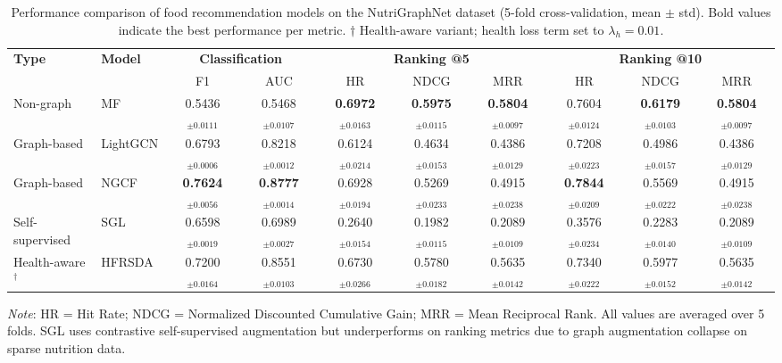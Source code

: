 \begin{table}[t]
\centering
\caption{Performance comparison of food recommendation models on the NutriGraphNet dataset
         (5-fold cross-validation, mean $\pm$ std).
         Bold values indicate the best performance per metric.
         $\dagger$ Health-aware variant; health loss term set to $\lambda_h=0.01$.}
\label{tab:main_results}
\setlength{\tabcolsep}{4pt}
\begin{tabular}{llcccccccc}
\toprule
\multirow{2}{*}{\textbf{Type}} &
\multirow{2}{*}{\textbf{Model}} &
\multicolumn{2}{c}{\textbf{Classification}} &
\multicolumn{3}{c}{\textbf{Ranking @5}} &
\multicolumn{3}{c}{\textbf{Ranking @10}} \\
\cmidrule(lr){3-4}\cmidrule(lr){5-7}\cmidrule(lr){8-10}
& & F1 & AUC & HR & NDCG & MRR & HR & NDCG & MRR \\
\midrule
Non-graph & MF & 0.5436$_{\pm0.0111}$ & 0.5468$_{\pm0.0107}$ & \textbf{0.6972$_{\pm0.0163}$} & \textbf{0.5975$_{\pm0.0115}$} & \textbf{0.5804$_{\pm0.0097}$} & 0.7604$_{\pm0.0124}$ & \textbf{0.6179$_{\pm0.0103}$} & \textbf{0.5804$_{\pm0.0097}$} \\
Graph-based & LightGCN & 0.6793$_{\pm0.0006}$ & 0.8218$_{\pm0.0012}$ & 0.6124$_{\pm0.0214}$ & 0.4634$_{\pm0.0153}$ & 0.4386$_{\pm0.0129}$ & 0.7208$_{\pm0.0223}$ & 0.4986$_{\pm0.0157}$ & 0.4386$_{\pm0.0129}$ \\
Graph-based & NGCF & \textbf{0.7624$_{\pm0.0056}$} & \textbf{0.8777$_{\pm0.0014}$} & 0.6928$_{\pm0.0194}$ & 0.5269$_{\pm0.0233}$ & 0.4915$_{\pm0.0238}$ & \textbf{0.7844$_{\pm0.0209}$} & 0.5569$_{\pm0.0222}$ & 0.4915$_{\pm0.0238}$ \\
Self-supervised & SGL & 0.6598$_{\pm0.0019}$ & 0.6989$_{\pm0.0027}$ & 0.2640$_{\pm0.0154}$ & 0.1982$_{\pm0.0115}$ & 0.2089$_{\pm0.0109}$ & 0.3576$_{\pm0.0234}$ & 0.2283$_{\pm0.0140}$ & 0.2089$_{\pm0.0109}$ \\
Health-aware$^\dagger$ & HFRSDA & 0.7200$_{\pm0.0164}$ & 0.8551$_{\pm0.0103}$ & 0.6730$_{\pm0.0266}$ & 0.5780$_{\pm0.0182}$ & 0.5635$_{\pm0.0142}$ & 0.7340$_{\pm0.0222}$ & 0.5977$_{\pm0.0152}$ & 0.5635$_{\pm0.0142}$ \\
\bottomrule
\end{tabular}
\vspace{1mm}
\footnotesize
\textit{Note}: HR = Hit Rate; NDCG = Normalized Discounted Cumulative Gain; MRR = Mean Reciprocal Rank.
All values are averaged over 5 folds. SGL uses contrastive self-supervised augmentation
but underperforms on ranking metrics due to graph augmentation collapse on sparse nutrition data.
\end{table}
